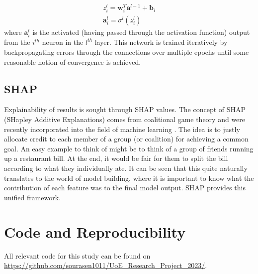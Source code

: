 \documentclass[%
 reprint,
 amsmath,amssymb,
 aps,nofootinbib
]{revtex4-2}
\begin{document}
\begin{gather*}
z^{l}_{i} = \mathbf{w}^{T}_{i}\mathbf{a}^{l-1} + \mathbf{b}_i\\
\mathbf{a}^{l}_i = \sigma^{l}(z^{l}_{i})
\end{gather*}
where $\mathbf{a}^{l}_{i}$ is the activated (having passed through the activation function) output from the $i^{th}$ neuron in the $l^{th}$ layer. This network is trained iteratively by backpropagating \cite{backprop} errors through the connections over multiple epochs until some reasonable notion of convergence is achieved.\\




\subsection{\label{SHAP}SHAP}
Explainability of results is sought through SHAP values. The concept of SHAP (SHapley Additive Explanations) comes from coalitional game theory and were recently incorporated into the field of machine learning \cite{shap_force_plot} \cite{shap}. The idea is to justly allocate credit to each member of a group (or coalition) for achieving a common goal. An easy example to think of might be to think of a group of friends running up a restaurant bill. At the end, it would be fair for them to split the bill according to what they individually ate. It can be seen that this quite naturally translates to the world of model building, where it is important to know what the contribution of each feature was to the final model output. SHAP provides this unified framework.\\

\section{\label{perf}Code and Reproducibility }
All relevant code for this study can be found on \href{https://github.com/sourasen1011/UoE_Research_Project_2023/tree/dev}{https://github.com/sourasen1011/UoE\_Research\_Project\_2023/}.


\cite{*}

\end{document}
